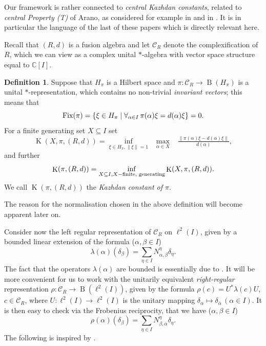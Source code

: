 \documentclass[11 pt, leqno]{amsart}
\newcommand{\ov}{\overline}
\newcommand{\cC}{\mathcal{C}}
\DeclareMathOperator{\Kaz}{K}
\DeclareMathOperator{\B}{B}
\theoremstyle{definition}
\newtheorem{definition}[theorem]{Definition}
\numberwithin{equation}{section}
\begin{document}
Our framework is rather connected  to \emph{central Kazhdan constants}, related to \emph{central Property (T)} of Arano, as considered for example in \cite{VaesValvekens} and in \cite{SergeyMakoto}. It is in particular the language of the last of these papers which is directly relevant here.


Recall that $(R,d)$ is a fusion algebra  and let $\mathcal{C}_R$ denote the complexification of $R$, which we can view as a complex unital $*$-algebra with vector space structure equal to $\mathbb{C}[I]$.




\begin{definition}
Suppose that $H_\pi$ is a Hilbert space and $\pi\colon\mathcal{C}_R\to \B(H_\pi)$ is a unital $*$-representation, which contains no non-trivial \emph{invariant vectors}; this means that 
\[ \textup{Fix} (\pi) = \{\xi \in H_\pi\mid  \forall_{\alpha \in I}\, \pi(\alpha) \xi = d(\alpha) \xi\}=0.\] 
For a finite  generating set $X\subseteq I$  set
\[\Kaz(X,\pi,(R,d))= \inf_{ \xi \in H_\pi, \|\xi\|=1 } \;\;\max_{\alpha \in X} \;\;\; \tfrac{\| \pi(\alpha )\xi - d(\alpha) \xi\|}{d(\alpha)}, \]
and further 
\[\Kaz(\pi,(R,d)) = \inf_{X\subseteq I, X - \textup{finite, generating}} \Kaz(X,\pi,(R,d)). \]
We call $ \Kaz(\pi,(R,d))$ the \emph{Kazhdan constant of $\pi$}. 
\end{definition}

The reason for the normalisation chosen in the above definition will become apparent later on.


Consider now the left regular representation of $\cC_R$ on $\ell^2(I)$, given by a bounded linear extension of the formula ($\alpha, \beta \in I$)
\[ \lambda(\alpha) (\delta_\beta) = 
\sum_{\eta \in I}   N_{\alpha, \beta}^\eta \delta_\eta.\]
The fact that the operators $\lambda(\alpha)$ are bounded is essentially due to \cite{HiaiIzumi}. It will be more convenient for us to work with the unitarily equivalent \emph{right-regular} representation $\rho\colon \cC_R \to \B(\ell^2(I))$, given by the formula $\rho(c) = U^* \lambda(c) U$, $c \in \cC_R$, where $U\colon \ell^2(I) \to \ell^2(I)$ is the unitary mapping $\delta_\alpha \mapsto \delta_{\overline{\alpha}}\,(\alpha\in I)$. It is then easy to check via the Frobenius reciprocity, that we have ($\alpha, \beta \in I$)
\[ \rho(\alpha) (\delta_\beta) = 
\sum_{\eta \in I}   N_{\beta, \ov\alpha}^\eta \delta_\eta.\]
The following is inspired by \cite[Proposition 2.4]{Arzhantseva}. 
\end{document}
